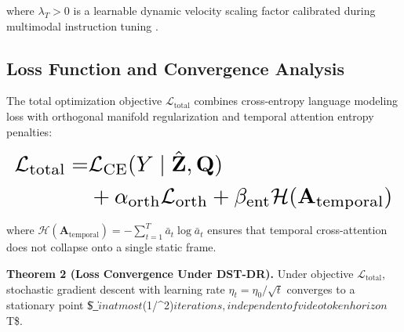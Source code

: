 \documentclass{article}
\begin{document}
where $\lambda_T > 0$ is a learnable dynamic velocity scaling factor calibrated during multimodal instruction tuning \cite{arxiv_2305_18290}.




\subsection{Loss Function and Convergence Analysis}


The total optimization objective $\mathcal{L}_{\text{total}}$ combines cross-entropy language modeling loss with orthogonal manifold regularization and temporal attention entropy penalties:



























\begin{equation}
\resizebox{\columnwidth}{!}{$\displaystyle
\begin{aligned}
\mathcal{L}_{\text{total}} = & \mathcal{L}_{\text{CE}}(Y \mid \hat{\mathbf{Z}}, \mathbf{Q}) \\
& + \alpha_{\text{orth}} \mathcal{L}_{\text{orth}} + \beta_{\text{ent}} \mathcal{H}(\mathbf{A}_{\text{temporal}})
\end{aligned}
$}
\end{equation}



























where $\mathcal{H}(\mathbf{A}_{\text{temporal}}) = -\sum_{t=1}^T \bar{a}_t \log \bar{a}_t$ ensures that temporal cross-attention does not collapse onto a single static frame.

\textbf{Theorem 2 (Loss Convergence Under DST-DR).} Under objective $\mathcal{L}_{\text{total}}$, stochastic gradient descent with learning rate $\eta_t = \eta_0 / \sqrt{t}$ converges to a stationary point \$\|\nabla {}\_{}\| \le \epsilon$ in at most $(1/\epsilon^2)$ iterations, independent of video token horizon $T\$.
\end{document}
